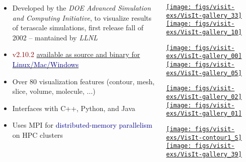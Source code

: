 \begin{frame}
\begin{columns}
\begin{column}{7.65cm}
\begin{small}
\begin{itemize}
        \item Developed by the \textit{DOE Advanced Simulation and Computing Initiative}, %
 to visualize results of terascale simulations, first release fall of 2002 -- mantained by \textit{LLNL}
        \item \textcolor{DarkRed}{v2.10.2} \href{https://wci.llnl.gov/simulation/computer-codes/visit/downloads}{available as source and binary for \textcolor{DarkBlue}{Linux/Mac/Windows}}
        \item Over 80 visualization features (contour, mesh, slice, volume, molecule, ...)
        \item Interfaces with C++, Python, and Java
        \item Uses MPI for \textcolor{DarkBlue}{distributed-memory parallelism} on HPC clusters
\end{itemize}
\end{small}
\end{column}
\begin{column}{5cm}
	\vspace{-2mm}

        \href{https://wci.llnl.gov/simulation/computer-codes/visit/gallery}{\texttt{[image: figs/visit-exs/VisIt-gallery\_33]}}
        \href{https://wci.llnl.gov/simulation/computer-codes/visit/gallery}{\texttt{[image: figs/visit-exs/VisIt-gallery\_10]}}

        \href{https://wci.llnl.gov/simulation/computer-codes/visit/gallery}{\texttt{[image: figs/visit-exs/VisIt-gallery\_00]}}
        \href{https://wci.llnl.gov/simulation/computer-codes/visit/gallery}{\texttt{[image: figs/visit-exs/VisIt-gallery\_05]}}

        \href{https://wci.llnl.gov/simulation/computer-codes/visit/gallery}{\texttt{[image: figs/visit-exs/VisIt-gallery\_02]}}
        \href{https://wci.llnl.gov/simulation/computer-codes/visit/gallery}{\texttt{[image: figs/visit-exs/VisIt-gallery\_01]}}

        \href{https://wci.llnl.gov/simulation/computer-codes/visit/gallery}{\texttt{[image: figs/visit-exs/VisIt-contour1\_S]}}
        \href{https://wci.llnl.gov/simulation/computer-codes/visit/gallery}{\texttt{[image: figs/visit-exs/VisIt-gallery\_39]}}
\end{column}
\end{columns}
\end{frame}


